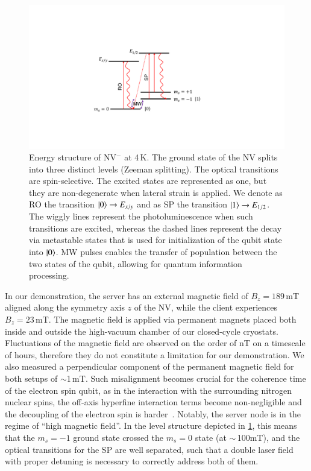\begin{figure}
    \centering
    \includegraphics[width=0.8\linewidth]{figures/qnodeos/supplementary/levels_NV.pdf}
    \caption{Energy structure of \ac{NV}$^-$ at 4\,K. The ground state of the \ac{NV} splits into three distinct levels (Zeeman splitting). The optical transitions are spin-selective. The excited states are represented as one, but they are non-degenerate when lateral strain is applied. We denote as \acf{RO} the transition $\ket{0}\rightarrow E_{x/y}$ and as \acf{SP} the transition $\ket{1}\rightarrow E_{1/2}$. The wiggly lines represent the photoluminescence when such transitions are excited, whereas the dashed lines represent the decay via metastable states that is used for initialization of the qubit state into $\ket{0}$. \acf{MW} pulses enables the transfer of population between the two states of the qubit, allowing for quantum information processing.}
    \label{fig:nv_levels}
\end{figure}

In our demonstration, the server has an external magnetic field of $B_z=189$\,mT aligned along the symmetry axis $z$ of the \ac{NV}, while the client experiences $B_z=23$\,mT. The magnetic field is applied via permanent magnets placed both inside and outside the high-vacuum chamber of our closed-cycle cryostats. Fluctuations of the magnetic field are observed on the order of nT on a timescale of hours, therefore they do not constitute a limitation for our demonstration. We also measured a perpendicular component of the permanent magnetic field for both setups of $\sim$1\,mT. Such misalignment becomes crucial for the coherence time of the electron spin qubit, as in the interaction with the surrounding nitrogen nuclear spins, the off-axis hyperfine interaction terms become non-negligible and the decoupling of the electron spin is harder~\cite{doherty_2013}. Notably, the server node is in the regime of ``high magnetic field''. In the level structure depicted in \cref{fig:nv_levels}, this means that the $m_s=-1$ ground state crossed the $m_s=0$ state (at $\sim$\,100mT), and the optical transitions for the \ac{SP} are well separated, such that a double laser field with proper detuning is necessary to correctly address both of them.

